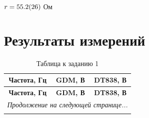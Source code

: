 \documentclass[a4paper,14pt]{article}
\begin{document}
$r = \num{55.2 \pm 2.6}$ Ом


\section{Результаты измерений}


\begin{longtable}{|c|c|c|}
    \caption{Таблица к заданию 1} \label{tab:tab1} \\
    \hline
    \textbf{Частота, Гц} & \textbf{GDM, В} & \textbf{DT838, В} \\
    \hline
    \endfirsthead

    \hline
    \textbf{Частота, Гц} & \textbf{GDM, В} & \textbf{DT838, В} \\
    \hline
    \endhead

    \hline
    \multicolumn{3}{|c|}{\textit{Продолжение на следующей странице...}} \\
    \hline
    \endfoot

    \hline
    \endlastfoot


\end{longtable}
\end{document}
